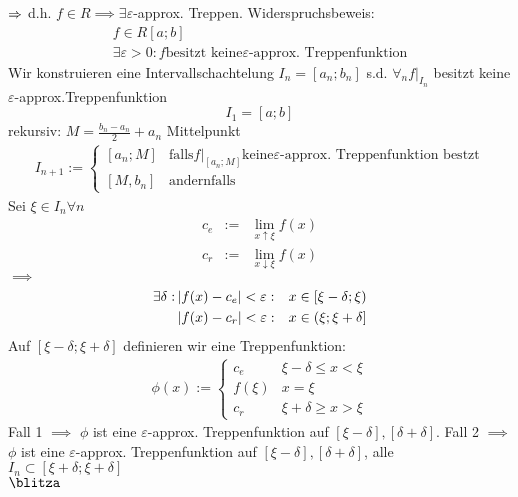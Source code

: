 \begin{Bew}{$\Rightarrow$}
  d.h. $f\in R\implies \exists \varepsilon$-approx. Treppen. Widerspruchsbeweis:
  \begin{align*}
    f\in R[a;b]\\
    \exists \varepsilon >0: f \text{besitzt keine} \varepsilon \text{-approx. Treppenfunktion}
  \end{align*}
  Wir konstruieren eine Intervallschachtelung $I_n=[a_n;b_n]$ s.d. $\forall_n f|_{I_n}$ besitzt keine $\varepsilon$-approx.Treppenfunktion
  \[I_1=[a;b]\]
  rekursiv: $M=\frac{b_n-a_n}{2} +a_n$ Mittelpunkt
  \begin{align*}
    I_{n+1}:=\begin{cases}
      [a_n;M]&\text{falls} f|_{[a_n;M]}\text{keine} \varepsilon \text{-approx. Treppenfunktion bestzt}\\ [M,b_n]& \text{andernfalls}        
    \end{cases}
  \end{align*}
  Sei $\xi\in I_n \forall n$
  \begin{align*}
    c_e&:=&\lim_{x\uparrow \xi} f(x)\\
    c_r&:=&\lim_{x\downarrow \xi} f(x)
  \end{align*}
  $\implies$
  \begin{align*}
    \exists \delta:&\left| f(x)-c_e \right|<\varepsilon:&x\in\left[\xi-\delta;\xi\right)\\
    &\left| f(x)-c_r \right|<\varepsilon:&x\in\left(\xi;\xi+\delta\right]\\
  \end{align*}
  Auf $[\xi-\delta;\xi+\delta]$ definieren wir eine Treppenfunktion:
  \begin{align*}
    \phi(x):=\begin{cases}
      c_e&\xi-\delta\leq x< \xi\\
      f(\xi)&x=\xi\\
      c_r&\xi+\delta\geq x>\xi
    \end{cases}
  \end{align*}
  Fall 1 $\implies$ $\phi$ ist eine $\varepsilon$-approx. Treppenfunktion auf $[\xi-\delta],[\delta+\delta]$. Fall 2 $\implies$ $\phi$ ist eine $\varepsilon$-approx. Treppenfunktion auf $[\xi-\delta],[\delta+\delta]$, alle $I_n \subset[\xi+\delta;\xi+\delta]$\\
  $\blitza$
\end{Bew}
